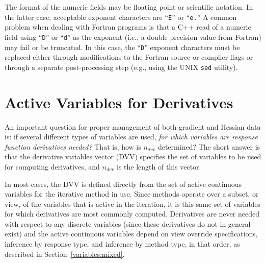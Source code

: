 The format of the numeric fields may be floating point or scientific
notation. In the latter case, acceptable exponent characters are
``\texttt{E}'' or ``\texttt{e.}'' A common problem when dealing with
Fortran programs is that a C++ read of a numeric field using
``\texttt{D}'' or ``\texttt{d}'' as the exponent (i.e., a double
precision value from Fortran) may fail or be truncated. In this case,
the ``\texttt{D}'' exponent characters must be replaced either through
modifications to the Fortran source or compiler flags or through a
separate post-processing step (e.g., using the UNIX \texttt{sed}
utility).

\section{Active Variables for Derivatives}\label{responses:active}

An important question for proper management of both gradient and
Hessian data is: if several different types of variables are used,
\emph{for which variables are response function derivatives needed?}
That is, how is $n_{dvv}$ determined?  The short answer is that the
derivative variables vector (DVV) specifies the set of variables to be
used for computing derivatives, and $n_{dvv}$ is the length of this
vector.  

In most cases, the DVV is defined directly from the set of active
continuous variables for the iterative method in use.  Since methods
operate over a subset, or view, of the variables that is active in the
iteration, it is this same set of variables for which derivatives are
most commonly computed.  Derivatives are never needed with respect to
any discrete variables (since these derivatives do not in general
exist) and the active continuous variables depend on view override
specifications, inference by response type, and inference by method
type, in that order, as described in Section~\ref{variables:mixed}.


